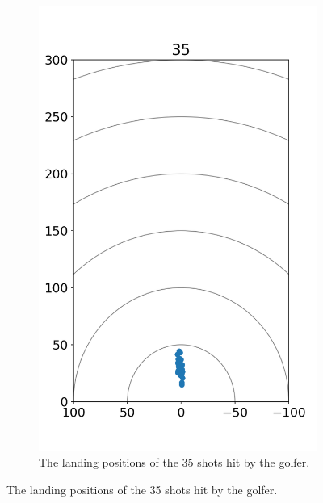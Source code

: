 \documentclass{kththesis}
\begin{document}
\begin{figure}
\begin{subfigure}{0.4\textwidth}
    \includegraphics[height=0.4\textheight]{Shots/35_shots.png} 
    \caption{The landing positions of the 35 shots hit by the golfer.}
    \label{fig:35_shots}
    \end{subfigure}
\end{figure}
\end{document}
